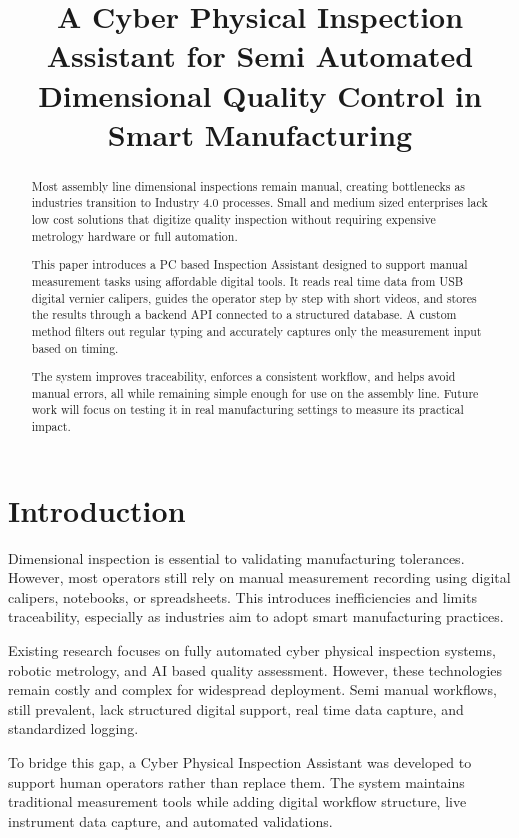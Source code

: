 \documentclass[conference]{IEEEtran}
\title{
A Cyber Physical Inspection Assistant for Semi Automated Dimensional Quality Control in Smart Manufacturing
}
\author{
\IEEEauthorblockN{Your Name}
\IEEEauthorblockA{
Your Institution \\
Email: your.email@domain.com
}
}
\begin{document}
\maketitle

\begin{abstract}
Most assembly line dimensional inspections remain manual, creating bottlenecks as industries transition to Industry 4.0 processes. Small and medium sized enterprises lack low cost solutions that digitize quality inspection without requiring expensive metrology hardware or full automation.

This paper introduces a PC based Inspection Assistant designed to support manual measurement tasks using affordable digital tools. It reads real time data from USB digital vernier calipers, guides the operator step by step with short videos, and stores the results through a backend API connected to a structured database. A custom method filters out regular typing and accurately captures only the measurement input based on timing.

The system improves traceability, enforces a consistent workflow, and helps avoid manual errors, all while remaining simple enough for use on the assembly line. Future work will focus on testing it in real manufacturing settings to measure its practical impact.
\end{abstract}

\section{Introduction}
Dimensional inspection is essential to validating manufacturing tolerances. However, most operators still rely on manual measurement recording using digital calipers, notebooks, or spreadsheets. This introduces inefficiencies and limits traceability, especially as industries aim to adopt smart manufacturing practices.

Existing research focuses on fully automated cyber physical inspection systems, robotic metrology, and AI based quality assessment. However, these technologies remain costly and complex for widespread deployment. Semi manual workflows, still prevalent, lack structured digital support, real time data capture, and standardized logging.

To bridge this gap, a Cyber Physical Inspection Assistant was developed to support human operators rather than replace them. The system maintains traditional measurement tools while adding digital workflow structure, live instrument data capture, and automated validations.
\end{document}
